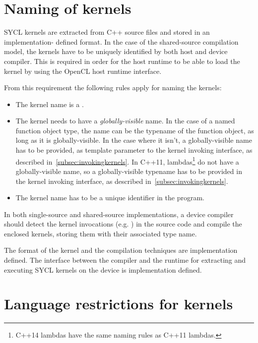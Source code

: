 \section{Naming of kernels}
\label{sec:naming.kernels}
SYCL kernels are extracted from C++ source files and stored in an implementation-
defined format. In the case of the shared-source compilation model, the kernels
have to be uniquely identified by both host and device compiler. This is
required in order for the host runtime to be able to load the kernel by using
the OpenCL host runtime interface.

From this requirement the following rules apply for naming the kernels:

\begin{itemize}
\item The kernel name is a .
\item The kernel needs to have a \emph{globally-visible} name. In the case of a
named function object type, the name can be the typename of the function object, as long as it is
globally-visible. In the case where it isn't, a globally-visible name has to be
provided, as template parameter to the kernel invoking interface, as described
in~\ref{subsec:invokingkernels}. In C++11, lambdas\footnote{C++14 lambdas have
the same naming rules as C++11 lambdas.} do not have a globally-visible name, so
a globally-visible typename has to be provided in the kernel invoking interface,
as described in~\ref{subsec:invokingkernels}.
\item The kernel name has to be a unique identifier in the program.
\end{itemize}

In both single-source and shared-source implementations, a device compiler should
detect the kernel invocations (e.g. )
in the source code and compile the enclosed kernels, storing them with their
associated type name.

The format of the kernel and the compilation techniques are implementation
defined. The interface between the compiler and the runtime for extracting and
executing SYCL kernels on the device is implementation defined.

\section{Language restrictions for kernels}
\label{sec:language.restrictions.kernels}

